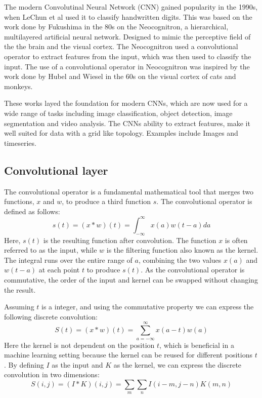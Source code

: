 The modern Convolutinal Neural Network (CNN) gained popularity in the 1990s, when LeChun et al\cite{LeChun} used it to classify handwritten digits. This was based on the work done by Fukushima in the 80s\cite{Fukushima} on the Neocognitron, a hierarchical, multilayered artificial neural network.
Designed to mimic the perceptive field of the the brain and the visual cortex. The Neocognitron used a convolutional operator to extract features from the input, which was then used to classify the input.
The use of a convolutional operator in Neocognitron was inspired by the work done by Hubel and Wiesel in the 60s\cite{HubelWiesel} on the visual cortex of cats and monkeys.

These works layed the foundation for modern CNNs, which are now used for a wide range of tasks including image classification, object detection, image segmentation and video analysis. 
The CNNs ability to extract features, make it well suited for data with a grid like topology. Examples include Images and timeseries. 

\subsection{Convolutional layer}
The convolutional operator is a fundamental mathematical tool that merges two functions, $x$ and $w$, to produce a third function $s$. The convolutional operator is defined as follows:
\begin{equation}
    s(t) = (x*w)(t) = \int_{-\infty}^\infty x(a)w(t-a)d a
\end{equation}
Here, $s(t)$ is the resulting function after convolution. The function $x$ is often referred to as the input, while $w$ is the filtering function also known as the kernel.
The integral runs over the entire range of $a$, combining the two values $x(a)$ and $w(t-a)$ at each point $t$ to produce $s(t)$.
As the convolutional operator is commutative, the order of the input and kernel can be swapped without changing the result.

Assuming $t$ is a integer, and using the commutative property we can express the following discrete convolution:
\begin{equation}
    S(t) = (x*w)(t) = \sum_{a=-\infty}^\infty x(a-t)w(a)
\end{equation}
Here the kernel is not dependent on the position $t$, which is beneficial in a machine learning setting because the kernel can be reused for different positions $t$. 
By defining $I$ as the input and $K$ as the kernel, we can express the discrete convolution in two dimensions:
\begin{equation}
    S(i, j) = (I*K)(i, j) = \sum_m \sum_n I(i-m, j-n)K(m, n)
\end{equation}

